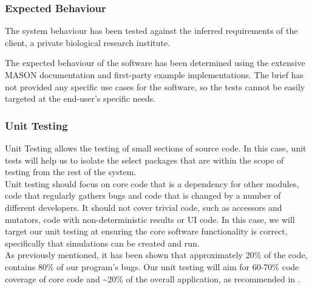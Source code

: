\documentclass[11pt]{article}
\begin{document}

\subsubsection{Expected Behaviour}
The system behaviour has been tested against the inferred requirements of the client, a private biological research institute.

The expected behaviour of the software has been determined using the extensive MASON documentation\cite{mason_doc} and first-party example implementations.
The brief has not provided any specific use cases for the software, so the tests cannot be easily targeted at the end-user's specific needs.



\subsubsection{Unit Testing}
Unit Testing allows the testing of small sections of source code.
In this case, unit tests will help us to isolate the select packages that are within the scope of testing from the rest of the system.
\\

Unit testing should focus on core code that is a dependency for other modules, code that regularly gathers bugs and code that is changed by a number of different developers.
It should not cover trivial code, such as accessors and mutators, code with non-deterministic results or UI code.\cite{dont_test_blindly}
In this case, we will target our unit testing at ensuring the core software functionality is correct, specifically that simulations can be created and run.
\\

As previously mentioned, it has been shown that approximately 20\% of the code, contains 80\% of our program's bugs.
Our unit testing will aim for 60-70\% code coverage of core code and \textasciitilde 20\% of the overall application, as recommended in \cite{dont_test_blindly}.
\end{document}
